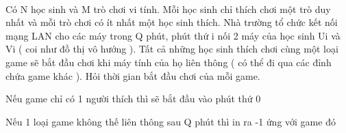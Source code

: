  

Có N học sinh và M trò chơi vi tính. Mỗi học sinh chỉ thích chơi một trò duy nhất và mỗi trò chơi có ít nhất một học sinh thích. Nhà trường tổ chức kết nối mạng LAN cho các máy trong Q phút, phút thứ i nối 2 máy của học sinh Ui và Vi ( coi như đồ thị vô hướng ). Tất cả những học sinh thích chơi cùng một loại game sẽ bắt đầu chơi khi máy tính của họ liên thông ( có thể đi qua các đỉnh chứa game khác ). Hỏi thời gian bắt đầu chơi của mỗi game.

Nếu game chỉ có 1 người thích thì sẽ bắt đầu vào phút thứ 0

Nếu 1 loại game không thế liên thông sau Q phút thì in ra -1 ứng với game đó